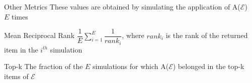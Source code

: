 \documentclass{beamer}
\begin{document}
%	
%

\begin{frame}{Other Metrics}
These values are obtained by simulating the application of A($\mathcal{E}$)\\$E$ times

	\begin{block}{Mean Reciprocal Rank}
		$\dfrac{1}{E}\sum_{i=1}^{E}\dfrac{1}{rank_i}$, where $rank_i$ is the rank of the returned item in the $i^{th}$ simulation
	\end{block}
	\vspace{5pt}
	\begin{block}{Top-k}
		The fraction of the $E$ simulations for which A($\mathcal{E}$) belonged in the top-k items of $\mathcal{E}$
	\end{block}
\end{frame}
\end{document}
